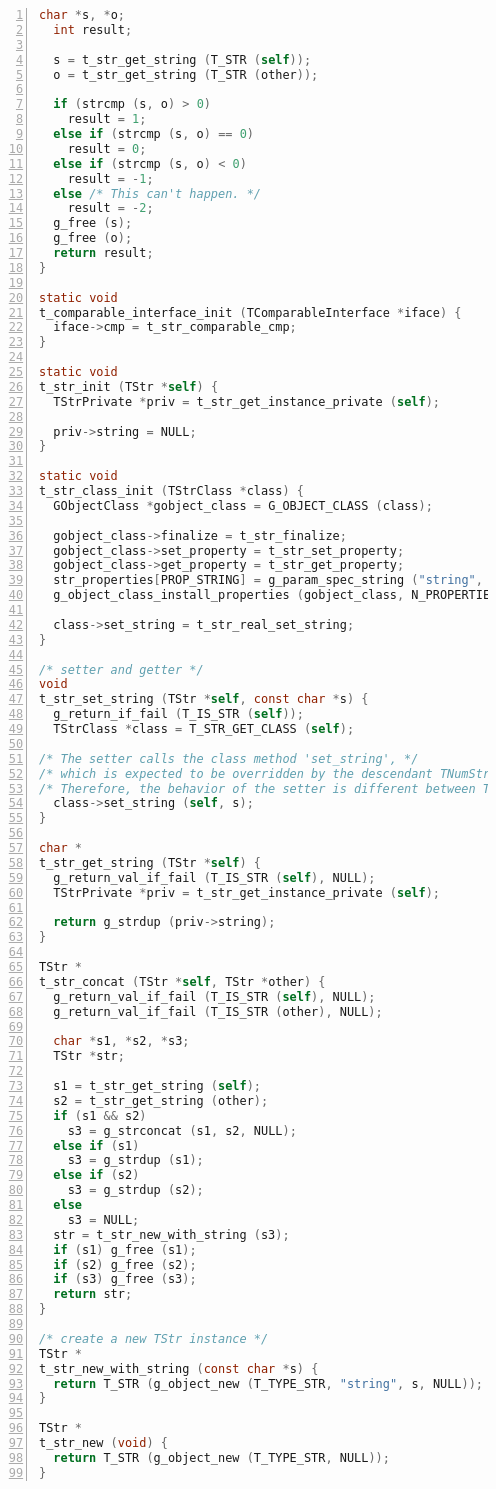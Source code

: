 \begin{lstlisting}[language=C, numbers=left]
  char *s, *o;
  int result;

  s = t_str_get_string (T_STR (self));
  o = t_str_get_string (T_STR (other));

  if (strcmp (s, o) > 0)
    result = 1;
  else if (strcmp (s, o) == 0)
    result = 0;
  else if (strcmp (s, o) < 0)
    result = -1;
  else /* This can't happen. */
    result = -2;
  g_free (s);
  g_free (o);
  return result;
}

static void
t_comparable_interface_init (TComparableInterface *iface) {
  iface->cmp = t_str_comparable_cmp;
}

static void
t_str_init (TStr *self) {
  TStrPrivate *priv = t_str_get_instance_private (self);

  priv->string = NULL;
}

static void
t_str_class_init (TStrClass *class) {
  GObjectClass *gobject_class = G_OBJECT_CLASS (class);

  gobject_class->finalize = t_str_finalize;
  gobject_class->set_property = t_str_set_property;
  gobject_class->get_property = t_str_get_property;
  str_properties[PROP_STRING] = g_param_spec_string ("string", "str", "string", "", G_PARAM_READWRITE);
  g_object_class_install_properties (gobject_class, N_PROPERTIES, str_properties);

  class->set_string = t_str_real_set_string;
}

/* setter and getter */
void
t_str_set_string (TStr *self, const char *s) {
  g_return_if_fail (T_IS_STR (self));
  TStrClass *class = T_STR_GET_CLASS (self);

/* The setter calls the class method 'set_string', */
/* which is expected to be overridden by the descendant TNumStr. */
/* Therefore, the behavior of the setter is different between TStr and TNumStr. */
  class->set_string (self, s);
}

char *
t_str_get_string (TStr *self) {
  g_return_val_if_fail (T_IS_STR (self), NULL);
  TStrPrivate *priv = t_str_get_instance_private (self);

  return g_strdup (priv->string);
}

TStr *
t_str_concat (TStr *self, TStr *other) {
  g_return_val_if_fail (T_IS_STR (self), NULL);
  g_return_val_if_fail (T_IS_STR (other), NULL);

  char *s1, *s2, *s3;
  TStr *str;

  s1 = t_str_get_string (self);
  s2 = t_str_get_string (other);
  if (s1 && s2)
    s3 = g_strconcat (s1, s2, NULL);
  else if (s1)
    s3 = g_strdup (s1);
  else if (s2)
    s3 = g_strdup (s2);
  else
    s3 = NULL;
  str = t_str_new_with_string (s3);
  if (s1) g_free (s1);
  if (s2) g_free (s2);
  if (s3) g_free (s3);
  return str;
}

/* create a new TStr instance */
TStr *
t_str_new_with_string (const char *s) {
  return T_STR (g_object_new (T_TYPE_STR, "string", s, NULL));
}

TStr *
t_str_new (void) {
  return T_STR (g_object_new (T_TYPE_STR, NULL));
}
\end{lstlisting}

